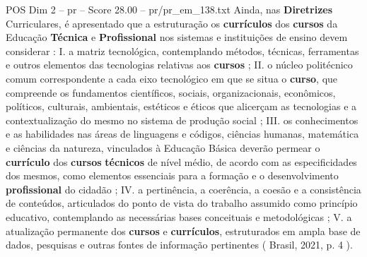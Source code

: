 \begin{textsample}{POS Dim 2 – pr – Score 28.00 – pr/pr\_em\_138.txt}
Ainda, nas \textbf{Diretrizes} Curriculares, é apresentado que a estruturação os \textbf{currículos} dos \textbf{cursos} da Educação \textbf{Técnica} e \textbf{Profissional} nos sistemas e instituições de ensino devem considerar : I. a matriz tecnológica, contemplando métodos, técnicas, ferramentas e outros elementos das tecnologias relativas aos \textbf{cursos} ; II. o núcleo politécnico comum correspondente a cada eixo tecnológico em que se situa o \textbf{curso}, que compreende os fundamentos científicos, sociais, organizacionais, econômicos, políticos, culturais, ambientais, estéticos e éticos que alicerçam as tecnologias e a contextualização do mesmo no sistema de produção social ; III. os conhecimentos e as habilidades nas áreas de linguagens e códigos, ciências humanas, matemática e ciências da natureza, vinculados à Educação Básica deverão permear o \textbf{currículo} dos \textbf{cursos} \textbf{técnicos} de nível médio, de acordo com as especificidades dos mesmos, como elementos essenciais para a formação e o desenvolvimento \textbf{profissional} do cidadão ; IV. a pertinência, a coerência, a coesão e a consistência de conteúdos, articulados do ponto de vista do trabalho assumido como princípio educativo, contemplando as necessárias bases conceituais e metodológicas ; V. a atualização permanente dos \textbf{cursos} e \textbf{currículos}, estruturados em ampla base de dados, pesquisas e outras fontes de informação pertinentes ( Brasil, 2021, p. 4 ).

\end{textsample}
